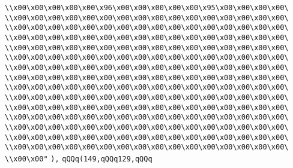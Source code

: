 \verb|\\x00\x00\x00\x00\x00\x96\x00\x00\x00\x00\x00\x95\x00\x00\x00\x00\|\newline
\verb|\\x00\x00\x00\x00\x00\x00\x00\x00\x00\x00\x00\x00\x00\x00\x00\x00\|\newline
\verb|\\x00\x00\x00\x00\x00\x00\x00\x00\x00\x00\x00\x00\x00\x00\x00\x00\|\newline
\verb|\\x00\x00\x00\x00\x00\x00\x00\x00\x00\x00\x00\x00\x00\x00\x00\x00\|\newline
\verb|\\x00\x00\x00\x00\x00\x00\x00\x00\x00\x00\x00\x00\x00\x00\x00\x00\|\newline
\verb|\\x00\x00\x00\x00\x00\x00\x00\x00\x00\x00\x00\x00\x00\x00\x00\x00\|\newline
\verb|\\x00\x00\x00\x00\x00\x00\x00\x00\x00\x00\x00\x00\x00\x00\x00\x00\|\newline
\verb|\\x00\x00\x00\x00\x00\x00\x00\x00\x00\x00\x00\x00\x00\x00\x00\x00\|\newline
\verb|\\x00\x00\x00\x00\x00\x00\x00\x00\x00\x00\x00\x00\x00\x00\x00\x00\|\newline
\verb|\\x00\x00\x00\x00\x00\x00\x00\x00\x00\x00\x00\x00\x00\x00\x00\x00\|\newline
\verb|\\x00\x00\x00\x00\x00\x00\x00\x00\x00\x00\x00\x00\x00\x00\x00\x00\|\newline
\verb|\\x00\x00\x00\x00\x00\x00\x00\x00\x00\x00\x00\x00\x00\x00\x00\x00\|\newline
\verb|\\x00\x00\x00\x00\x00\x00\x00\x00\x00\x00\x00\x00\x00\x00\x00\x00\|\newline
\verb|\\x00\x00\x00\x00\x00\x00\x00\x00\x00\x00\x00\x00\x00\x00\x00\x00\|\newline
\verb|\\x00\x00\x00\x00\x00\x00\x00\x00\x00\x00\x00\x00\x00\x00\x00\x00\|\newline
\verb|\\x00\x00"|\newline
\verb|),|\newline
\verb|qQQq(149,qQQq129,qQQq|\newline
